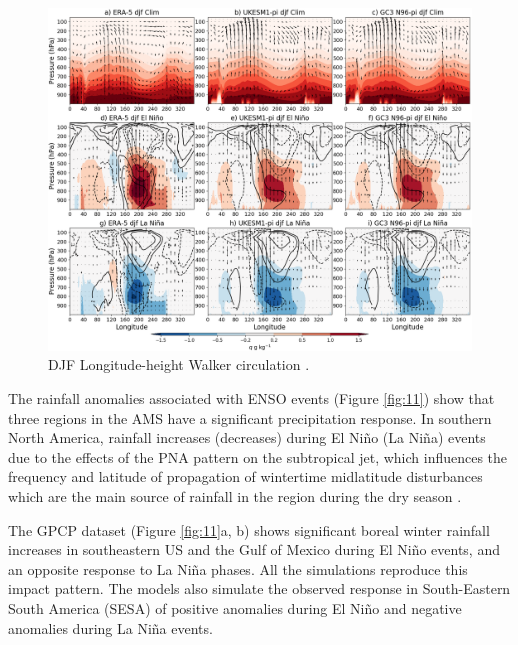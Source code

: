 \begin{figure}
\includegraphics[width=\linewidth]{figures/walkerfinal}
\caption[Walker circulation anomalies associated with ENSO]{DJF Longitude-height Walker circulation .}
\label{fig:swalker}
\end{figure}


The rainfall anomalies associated with ENSO events (Figure \ref{fig:11}) show that three regions in the AMS have a significant precipitation response.
In southern North America, rainfall increases (decreases) during El Ni\~no (La Ni\~na) events due to the effects of the PNA pattern on the subtropical jet, which influences the frequency and latitude of propagation of wintertime midlatitude disturbances which are the main source of rainfall in the region during the dry season \citep{vera2006,bayr2019}.

The GPCP dataset (Figure \ref{fig:11}a, b) shows significant boreal winter rainfall increases in southeastern US and the Gulf of Mexico during El Ni\~no events, and an opposite response to La Ni\~na phases. All the simulations reproduce this impact pattern. 
The models also simulate the observed response in South-Eastern South America (SESA) of positive anomalies during El Ni\~no and negative anomalies during La Ni\~na events. 

